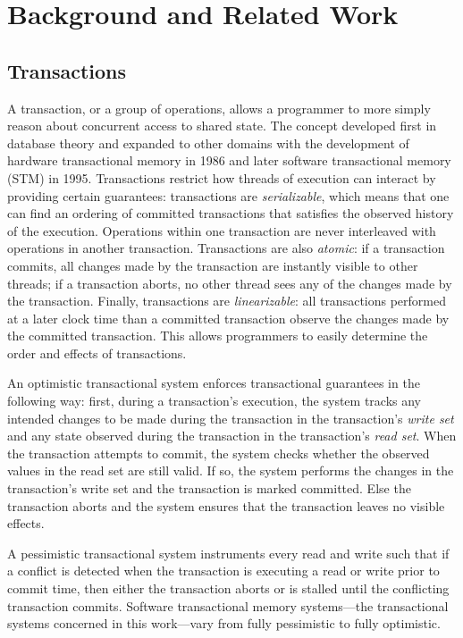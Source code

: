 \chapter{Background and Related Work}

\section{Transactions}
A transaction, or a group of operations, allows a programmer to more simply reason about concurrent access to shared state. The concept developed first in database theory and expanded to other domains with the development of hardware transactional memory in 1986 and later software transactional memory (STM) in 1995. Transactions restrict how threads of execution can interact by providing certain guarantees: transactions are \emph{serializable}, which means that one can find an ordering of committed transactions that satisfies the observed history of the execution. Operations within one transaction are never interleaved with operations in another transaction. Transactions are also \emph{atomic}: if a transaction commits, all changes made by the transaction are instantly visible to other threads; if a transaction aborts, no other thread sees any of the changes made by the transaction. Finally, transactions are \emph{linearizable}\cite{linearizability}: all transactions performed at a later clock time than a committed transaction observe the changes made by the committed transaction. This allows programmers to easily determine the order and effects of transactions.

An optimistic transactional system\cite{harristm} enforces transactional guarantees in the following way: first, during a transaction's execution, the system tracks any intended changes to be made during the transaction in the transaction's \emph{write set} and any state observed during the transaction in the transaction's \emph{read set}. When the transaction attempts to commit, the system checks whether the observed values in the read set are still valid. If so, the system performs the changes in the transaction's write set and the transaction is marked committed. Else the transaction aborts and the system ensures that the transaction leaves no visible effects.

A pessimistic transactional system instruments every read and write such that if a conflict is detected when the transaction is executing a read or write prior to commit time, then either the transaction aborts or is stalled until the conflicting transaction commits. Software transactional memory systems---the transactional systems concerned in this work---vary from fully pessimistic to fully optimistic.

